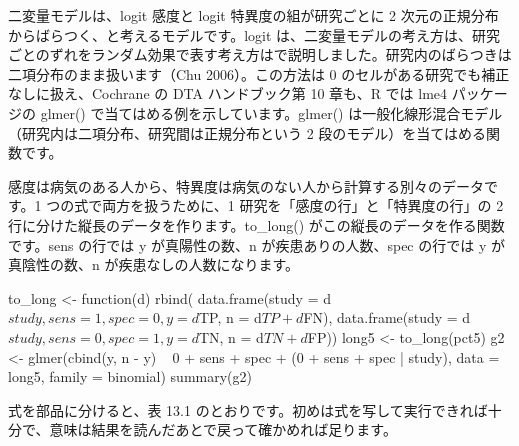 二変量モデルは、logit 感度と logit 特異度の組が研究ごとに 2 次元の正規分布からばらつく、と考えるモデルです。logit は、二変量モデルの考え方は、研究ごとのずれをランダム効果で表す考え方はで説明しました。研究内のばらつきは二項分布のまま扱います（Chu 2006）。この方法は 0 のセルがある研究でも補正なしに扱え、Cochrane の DTA ハンドブック第 10 章も、R では lme4 パッケージの glmer() で当てはめる例を示しています。glmer() は一般化線形混合モデル（研究内は二項分布、研究間は正規分布という 2 段のモデル）を当てはめる関数です。

感度は病気のある人から、特異度は病気のない人から計算する別々のデータです。1 つの式で両方を扱うために、1 研究を「感度の行」と「特異度の行」の 2 行に分けた縦長のデータを作ります。to\_long() がこの縦長のデータを作る関数です。sens の行では y が真陽性の数、n が疾患ありの人数、spec の行では y が真陰性の数、n が疾患なしの人数になります。

\begin{rcode}
to_long <- function(d) rbind(
  data.frame(study = d$study, sens = 1, spec = 0,
             y = d$TP, n = d$TP + d$FN),
  data.frame(study = d$study, sens = 0, spec = 1,
             y = d$TN, n = d$TN + d$FP))
long5 <- to_long(pct5)
g2 <- glmer(cbind(y, n - y) ~ 0 + sens + spec +
              (0 + sens + spec | study),
            data = long5, family = binomial)
summary(g2)
\end{rcode}

式を部品に分けると、表 13.1 のとおりです。初めは式を写して実行できれば十分で、意味は結果を読んだあとで戻って確かめれば足ります。

\begin{kkcenter}
\end{kkcenter}


